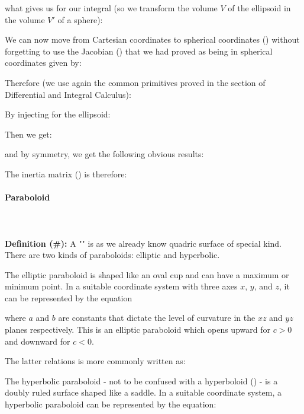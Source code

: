 {	what gives us for our integral (so we transform the volume $V$ of the ellipsoid in the volume $V'$ of a sphere):
	
	We can now move from Cartesian coordinates to spherical coordinates () without forgetting to use the Jacobian () that we had proved as being in spherical coordinates given by:
	
	Therefore (we use again the common primitives proved in the section of Differential and Integral Calculus):
	
	By injecting for the ellipsoid:
	
	Then we get:
	
	and by symmetry, we get the following obvious results:
	
	The inertia matrix () is therefore:
	
	
	\paragraph{Paraboloid}\label{paraboloid}\mbox{}\\\\
	\textbf{Definition (\#\mydef):} A "" is as we already know quadric surface of special kind. There are two kinds of paraboloids: elliptic and hyperbolic.
	
	The elliptic paraboloid is shaped like an oval cup and can have a maximum or minimum point. In a suitable coordinate system with three axes $x$, $y$, and $z$, it can be represented by the equation
	
	where $a$ and $b$ are constants that dictate the level of curvature in the $xz$ and $yz$ planes respectively. This is an elliptic paraboloid which opens upward for $c > 0$ and downward for $c < 0$.
	
	The latter relations is more commonly written as:
	
	
	The hyperbolic paraboloid - not to be confused with a hyperboloid () - is a doubly ruled surface shaped like a saddle. In a suitable coordinate system, a hyperbolic paraboloid can be represented by the equation:
	
}

